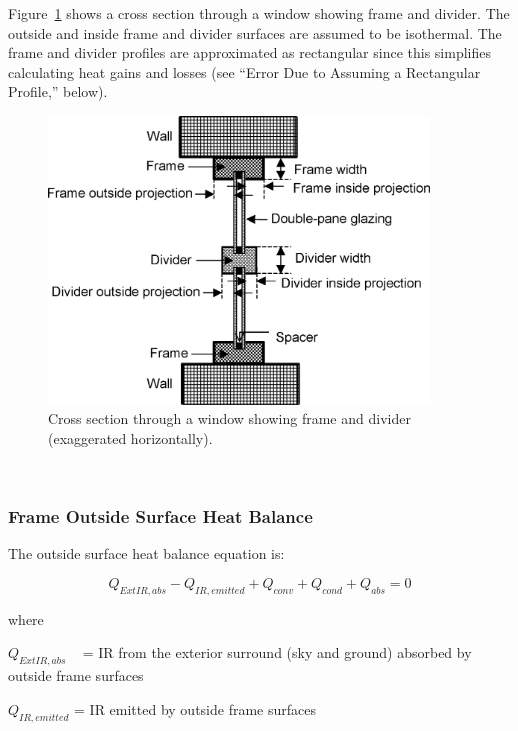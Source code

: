 Figure~\ref{fig:cross-section-through-a-window-showing-frame} shows a cross section through a window showing frame and divider. The outside and inside frame and divider surfaces are assumed to be isothermal. The frame and divider profiles are approximated as rectangular since this simplifies calculating heat gains and losses (see ``Error Due to Assuming a Rectangular Profile,'' below).

\begin{figure}[hbtp] %
\centering
\includegraphics[width=0.9\textwidth, height=0.9\textheight, keepaspectratio=true]{media/image1557.png}
\caption{Cross section through a window showing frame and divider (exaggerated horizontally). \label{fig:cross-section-through-a-window-showing-frame}}
\end{figure}

\textbf{~}

\subsubsection{Frame Outside Surface Heat Balance}\label{frame-outside-surface-heat-balance}

The outside surface heat balance equation is:

\begin{equation}
{Q_{ExtIR,abs}} - {Q_{IR,emitted}} + {Q_{conv}} + {Q_{cond}} + {Q_{abs}} = 0
\end{equation}

where

\({Q_{ExtIR,abs}}\) ~ = IR from the exterior surround (sky and ground) absorbed by outside frame surfaces

\({Q_{IR,emitted}}\) = IR emitted by outside frame surfaces

